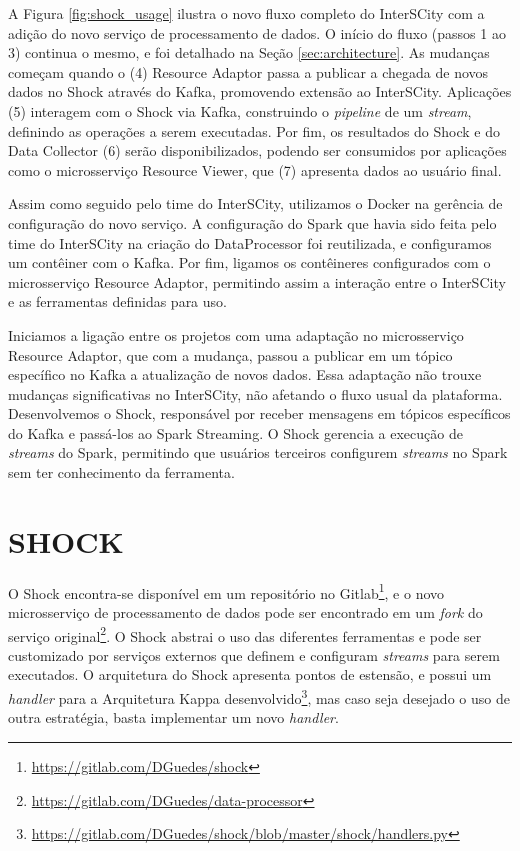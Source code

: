 A Figura \ref{fig:shock_usage} ilustra o novo fluxo completo do InterSCity com
a adição do novo serviço de processamento de dados. O início do fluxo (passos 1
ao 3) continua o mesmo, e foi detalhado na Seção \ref{sec:architecture}. As
mudanças começam quando o (4) Resource Adaptor passa a publicar a chegada de
novos dados no Shock através do Kafka, promovendo extensão ao InterSCity.
Aplicações (5) interagem com o Shock via Kafka, construindo o \textit{pipeline}
de um \textit{stream}, definindo as operações a serem executadas.  Por fim, os
resultados do Shock e do Data Collector (6) serão disponibilizados, podendo ser
consumidos por aplicações como o microsserviço Resource Viewer, que (7)
apresenta dados ao usuário final.

Assim como seguido pelo time do InterSCity, utilizamos o Docker na gerência de
configuração do novo serviço. A configuração do Spark que havia sido feita pelo
time do InterSCity na criação do DataProcessor foi reutilizada, e configuramos
um contêiner com o Kafka. Por fim, ligamos os contêineres configurados com o
microsserviço Resource Adaptor, permitindo assim a interação entre o InterSCity
e as ferramentas definidas para uso.

Iniciamos a ligação entre os projetos com uma adaptação no microsserviço
Resource Adaptor, que com a mudança, passou a publicar em um tópico específico
no Kafka a atualização de novos dados. Essa adaptação não trouxe mudanças
significativas no InterSCity, não afetando o fluxo usual da plataforma.
Desenvolvemos o Shock, responsável por receber mensagens em tópicos
específicos do Kafka e passá-los ao Spark Streaming. O Shock gerencia a
execução de \textit{streams} do Spark, permitindo que usuários terceiros
configurem \textit{streams} no Spark sem ter conhecimento da ferramenta.

\section{SHOCK}

O Shock encontra-se disponível em um repositório no
Gitlab\footnote{\url{https://gitlab.com/DGuedes/shock}}, e o novo microsserviço
de processamento de dados pode ser encontrado em um \textit{fork} do serviço
original\footnote{\url{https://gitlab.com/DGuedes/data-processor}}. O Shock
abstrai o uso das diferentes ferramentas e pode ser customizado
por serviços externos que definem e configuram \textit{streams} para serem
executados. O arquitetura do Shock apresenta pontos de estensão, e possui
um \textit{handler} para a Arquitetura Kappa
desenvolvido\footnote{\url{https://gitlab.com/DGuedes/shock/blob/master/shock/handlers.py}},
mas caso seja desejado o uso de outra estratégia, basta implementar um novo
\textit{handler}.

